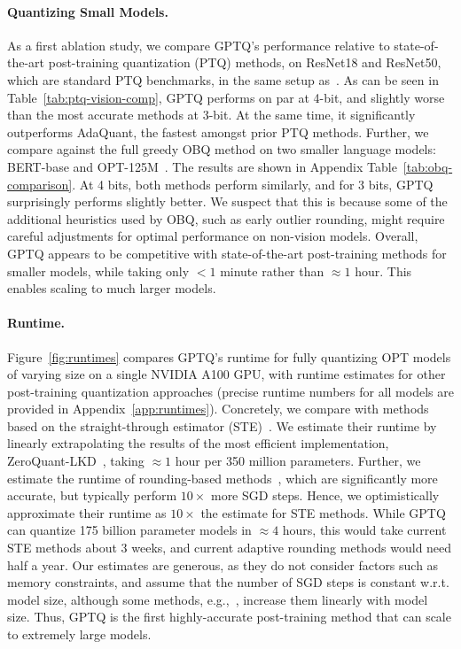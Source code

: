 \paragraph{Quantizing Small Models.} As a first ablation study, we compare GPTQ's performance relative to state-of-the-art post-training quantization (PTQ) methods, on ResNet18 and ResNet50, which are standard PTQ benchmarks, in the same setup as~\cite{frantar2022obc}. As can be seen in Table~\ref{tab:ptq-vision-comp}, GPTQ performs on par at 4-bit, and slightly worse than the most accurate methods at 3-bit. At the same time, it significantly outperforms AdaQuant, the fastest amongst prior PTQ methods. Further, we compare against the full greedy OBQ method on two smaller language models: BERT-base \cite{devlin2018bert} and OPT-125M~\cite{zhang2022opt}. The results are shown in Appendix Table~\ref{tab:obq-comparison}. 
At 4 bits, both methods perform similarly, and for 3 bits, GPTQ surprisingly performs slightly better. We suspect that this is because some of the additional heuristics used by OBQ, such as early outlier rounding, might require careful adjustments for optimal performance on non-vision models. Overall, GPTQ appears to be competitive with state-of-the-art post-training methods for smaller models, while taking only $< 1$ minute rather than $\approx 1$ hour. This enables scaling to much larger models.

\paragraph{Runtime.} Figure~\ref{fig:runtimes} compares GPTQ's runtime for fully quantizing OPT models of varying size on a single NVIDIA A100 GPU, with runtime estimates for other post-training quantization approaches (precise runtime numbers for all models are provided in Appendix~\ref{app:runtimes}). Concretely, we compare with methods based on the straight-through estimator (STE)~\cite{yao2022zeroquant, hubara2021accurate}. We estimate their runtime by linearly extrapolating the results of the most efficient implementation, ZeroQuant-LKD~\cite{yao2022zeroquant}, taking $\approx 1$ hour per 350 million parameters. Further, we estimate the runtime of rounding-based methods~\cite{nagel2020up, li2021brecq}, which are significantly more accurate, but typically perform $10\times$ more SGD steps. Hence, we optimistically approximate their runtime as $10\times$ the estimate for STE methods. While GPTQ can quantize 175 billion parameter models in $\approx 4$ hours, this would take current STE methods about 3 weeks, and current adaptive rounding methods would need half a year. Our estimates are generous, as they do not consider factors such as memory constraints, and assume that the number of SGD steps is constant w.r.t. model size, although some methods, e.g.,~\cite{yao2022zeroquant}, increase them linearly with model size. Thus, GPTQ is the first highly-accurate post-training method that can scale to extremely large models. 

